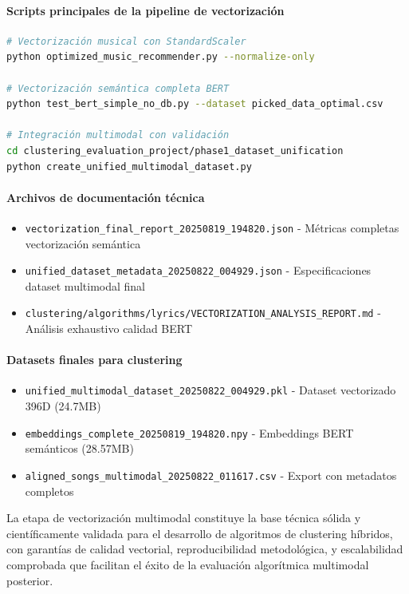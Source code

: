 \documentclass[12pt,a4paper]{report}
\begin{document}
\paragraph{Scripts principales de la pipeline de vectorización}

\begin{lstlisting}[language=bash, caption={Comandos principales para reproducibilidad}]
# Vectorización musical con StandardScaler
python optimized_music_recommender.py --normalize-only

# Vectorización semántica completa BERT
python test_bert_simple_no_db.py --dataset picked_data_optimal.csv

# Integración multimodal con validación
cd clustering_evaluation_project/phase1_dataset_unification
python create_unified_multimodal_dataset.py
\end{lstlisting}

\paragraph{Archivos de documentación técnica}
\begin{itemize}
    \item \texttt{vectorization\_final\_report\_20250819\_194820.json} - Métricas completas vectorización semántica
    \item \texttt{unified\_dataset\_metadata\_20250822\_004929.json} - Especificaciones dataset multimodal final
    \item \texttt{clustering/algorithms/lyrics/VECTORIZATION\_ANALYSIS\_REPORT.md} - Análisis exhaustivo calidad BERT
\end{itemize}

\paragraph{Datasets finales para clustering}
\begin{itemize}
    \item \texttt{unified\_multimodal\_dataset\_20250822\_004929.pkl} - Dataset vectorizado 396D (24.7MB)
    \item \texttt{embeddings\_complete\_20250819\_194820.npy} - Embeddings BERT semánticos (28.57MB)
    \item \texttt{aligned\_songs\_multimodal\_20250822\_011617.csv} - Export con metadatos completos
\end{itemize}

La etapa de vectorización multimodal constituye la base técnica sólida y científicamente validada para el desarrollo de algoritmos de clustering híbridos, con garantías de calidad vectorial, reproducibilidad metodológica, y escalabilidad comprobada que facilitan el éxito de la evaluación algorítmica multimodal posterior.
\end{document}
